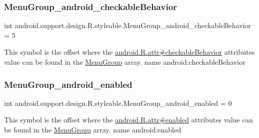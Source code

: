 \subsubsection{\texorpdfstring{Menu\+Group\+\_\+android\+\_\+checkable\+Behavior}{MenuGroup\_android\_checkableBehavior}}
{\footnotesize\ttfamily int android.\+support.\+design.\+R.\+styleable.\+Menu\+Group\+\_\+android\+\_\+checkable\+Behavior = 5\hspace{0.3cm}{\ttfamily [static]}}

This symbol is the offset where the \hyperlink{}{android.\+R.\+attr\#checkable\+Behavior} attribute\textquotesingle{}s value can be found in the \hyperlink{classandroid_1_1support_1_1design_1_1R_1_1styleable_a39805bd4a947832cbac3bd5f30eef344}{Menu\+Group} array.  name android\+:checkable\+Behavior \mbox{\label{classandroid_1_1support_1_1design_1_1R_1_1styleable_a86f6abd170445535b48efa83a9214c35}} 
\subsubsection{\texorpdfstring{Menu\+Group\+\_\+android\+\_\+enabled}{MenuGroup\_android\_enabled}}
{\footnotesize\ttfamily int android.\+support.\+design.\+R.\+styleable.\+Menu\+Group\+\_\+android\+\_\+enabled = 0\hspace{0.3cm}{\ttfamily [static]}}

This symbol is the offset where the \hyperlink{}{android.\+R.\+attr\#enabled} attribute\textquotesingle{}s value can be found in the \hyperlink{classandroid_1_1support_1_1design_1_1R_1_1styleable_a39805bd4a947832cbac3bd5f30eef344}{Menu\+Group} array.  name android\+:enabled \mbox{\label{classandroid_1_1support_1_1design_1_1R_1_1styleable_a432ced7a651f227099d551787caa5dc8}} 
